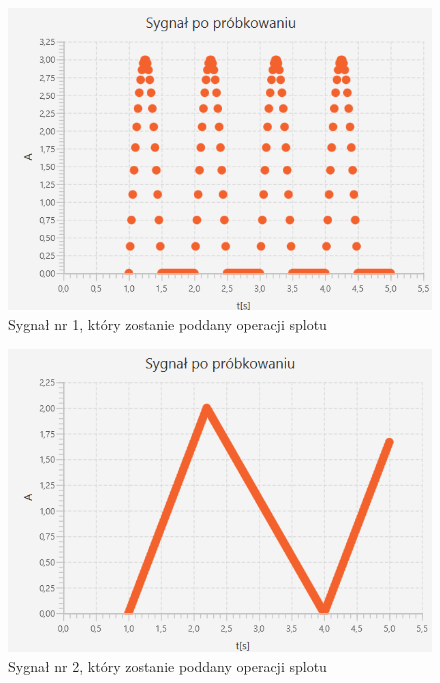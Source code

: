 \documentclass[12pt]{article}
\begin{document}
\begin{figure}[H]
    \centering
	\includegraphics[width=\linewidth]{sygnal_po_probkowaniu_2.1.png}
    \caption{Sygnał nr 1, który zostanie poddany operacji splotu}
    \label{Sygnał_6.1}
\end{figure}

\begin{figure}[H]
    \centering
	\includegraphics[width=\linewidth]{sygnal_po_probkowaniu_2.2.png}
    \caption{Sygnał nr 2, który zostanie poddany operacji splotu}
    \label{Sygnał_6.2}
\end{figure}
\end{document}
